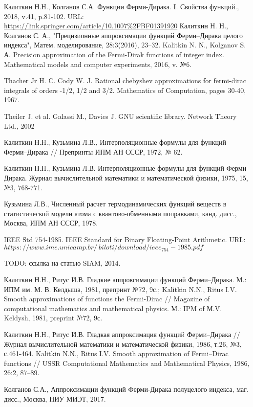 \begin{thebibliography}{99}
 Калиткин Н.Н., Колганов С.А. Функции Ферми-Дирака. I. Свойства
функций., 2018, v.41, p.81-102.
URL: \href{https://link.springer.com/article/10.1007\%2FBF01391920}{https://link.springer.com/article/10.1007\%2FBF01391920}
 Калиткин Н. Н., Колганов С. А., "Прецизионные аппроксимации функций Ферми–Дирака целого индекса", Матем. моделирование, 28:3(2016), 23–32.
Kalitkin N. N., Kolganov S. А. Precision approximation of the Fermi-Dirak functions of integer index. Mathematical models and computer experiments, 2016, v. №6.

 Thacher Jr H. C. Cody W. J. Rational chebyshev approximations for fermi-dirac integrals of orders -1/2, 1/2 and 3/2. Mathematics of Computation, pages 30-40, 1967.

 Theiler J. et al. Galassi M., Davies J. GNU scientific library. Network Theory Ltd., 2002

 Калиткин Н.Н., Кузьмина Л.В., Интерполяционные формулы для функций Ферми–Дирака // Препринты ИПМ АН СССР, 1972, № 62.

 Калиткин Н.Н., Кузьмина Л.В. Интерполяционные формулы для функций Ферми-Дирака. Журнал вычислительной математики и математической физики, 1975, 15, №3, 768-771.

 Кузьмина Л.В., Численный расчет термодинамических функций веществ в статистической модели атома с квантово-обменными поправками, канд. дисс., Москва, ИПМ АН СССР, 1978.

 IEEE Std 754-1985. IEEE Standard for Binary Floating-Point Arithmetic. \linebreak
URL: \href{https://www.ime.unicamp.br/~biloti/download/ieee_754-1985.pdf}{$https://www.ime.unicamp.br/~biloti/download/ieee_754-1985.pdf$}

 TODO: ссылка на статью SIAM, 2014.

 Калиткин Н.Н., Ритус И.В. Гладкие аппроксимации функций Ферми–Дирака. М.: ИПМ им. М. В. Келдыша, 1981, препринт №72, 9с.;
Kalitkin N.N., Ritus I.V. Smooth approximations of functions the Fermi-Dirac // Magazine of computational mathematics and mathematical physics. М.: IPM of М.V. Keldysh, 1981, preprint №72, 9с.

 Калиткин Н.Н., Ритус И.В. Гладкая аппроксимация функций Ферми–Дирака // Журнал вычислительной математики и математической физики, 1986, т.26, №3, с.461-464.
Kalitkin N.N., Ritus I.V. Smooth approximation of Fermi–Dirac functions // USSR Computational
Mathematics and Mathematical Physics, 1986, 26:2, 87–89.

 Колганов С.А., Аппроксимации функций Ферми-Дирака полуцелого индекса, маг. дисс., Москва, НИУ МИЭТ, 2017.

\end{thebibliography}




